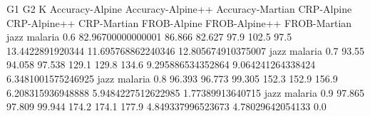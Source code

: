 G1 G2 K Accuracy-Alpine Accuracy-Alpine++ Accuracy-Martian CRP-Alpine CRP-Alpine++ CRP-Martian FROB-Alpine FROB-Alpine++ FROB-Martian
jazz malaria 0.6 82.96700000000001 86.866 82.627 97.9 102.5 97.5 13.4422891920344 11.695768862240346 12.805674910375007
jazz malaria 0.7 93.55 94.058 97.538 129.1 129.8 134.6 9.295886534352864 9.064241264338424 6.3481001575246925
jazz malaria 0.8 96.393 96.773 99.305 152.3 152.9 156.9 6.208315936948888 5.9484227512622985 1.77389913640715
jazz malaria 0.9 97.865 97.809 99.944 174.2 174.1 177.9 4.849337996523673 4.78029642054133 0.0
